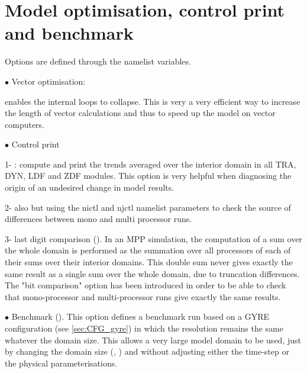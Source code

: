 \documentclass[../main/NEMO_manual]{subfiles}
\begin{document}
\section{Model optimisation, control print and benchmark}
\label{sec:MISC_opt}


Options are defined through the   namelist variables.

$\bullet$ Vector optimisation:

 enables the internal loops to collapse.
This is very a very efficient way to increase the length of vector calculations and thus
to speed up the model on vector computers.
 
 
 
$\bullet$ Control print %

1- : compute and print the trends averaged over the interior domain in all TRA, DYN, LDF and
ZDF modules.
This option is very helpful when diagnosing the origin of an undesired change in model results. 

2- also  but using the nictl and njctl namelist parameters to check the source of differences between
mono and multi processor runs.

3- last digit comparison ().
In an MPP simulation, the computation of a sum over the whole domain is performed as the summation over
all processors of each of their sums over their interior domains.
This double sum never gives exactly the same result as a single sum over the whole domain,
due to truncation differences.
The "bit comparison" option has been introduced in order to be able to check that
mono-processor and multi-processor runs give exactly the same results.

$\bullet$  Benchmark ().
This option defines a benchmark run based on a GYRE configuration (see \autoref{sec:CFG_gyre}) in which
the resolution remains the same whatever the domain size.
This allows a very large model domain to be used, just by changing the domain size (, ) and
without adjusting either the time-step or the physical parameterisations. 

\biblio

\pindex
\end{document}
